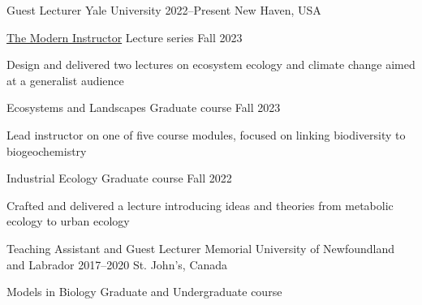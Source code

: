 

\begin{cventries}

  \cventry
    {Guest Lecturer} %
    {Yale University} %
    {2022--Present} %
    {New Haven, USA} %
    {
      \begin{cvsubentries}
       \cvsubentry
        {\href{https://ypa.yale.edu/skills-and-career-development/modern-instructor}{The Modern Instructor}}
        {\footnotesize Lecture series}
        {Fall 2023}
        {
         \begin{cvitems}
          \item Design and delivered two lectures on ecosystem ecology and climate change aimed at a generalist audience
         \end{cvitems} 
        }
       \cvsubentry
        {Ecosystems and Landscapes}
        {\footnotesize Graduate course}
        {Fall 2023}
        {
         \begin{cvitems}
          \item Lead instructor on one of five course modules, focused on linking biodiversity to biogeochemistry
         \end{cvitems} 
        }
       \cvsubentry
         {Industrial Ecology}
         {\footnotesize Graduate course}
         {Fall 2022}
         {
         \begin{cvitems}
          \item Crafted and delivered a lecture introducing ideas and theories from metabolic ecology to urban ecology
         \end{cvitems} 
         }
      \end{cvsubentries}
    }
  \cventry
    {Teaching Assistant and Guest Lecturer} %
    {Memorial University of Newfoundland and Labrador} %
    {2017--2020} %
    {St. John's, Canada} %
    {
      \begin{cvsubentries}
       \cvsubentry
         {Models in Biology}
         {\footnotesize Graduate and Undergraduate course}

\end{cvsubentries}}
\end{cventries}
